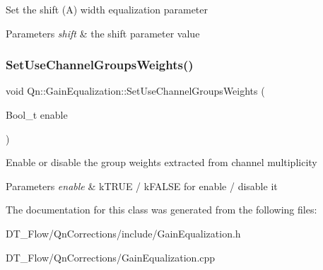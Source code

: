 Set the shift (A) width equalization parameter 
\begin{DoxyParams}{Parameters}
{\em shift} & the shift parameter value \\
\hline
\end{DoxyParams}
\mbox{\label{classQn_1_1GainEqualization_af136135624a62a1372fcf31548b358d7}} 
\subsubsection{\texorpdfstring{Set\+Use\+Channel\+Groups\+Weights()}{SetUseChannelGroupsWeights()}}
{\footnotesize\ttfamily void Qn\+::\+Gain\+Equalization\+::\+Set\+Use\+Channel\+Groups\+Weights (\begin{DoxyParamCaption}\item[{Bool\+\_\+t}]{enable }\end{DoxyParamCaption})\hspace{0.3cm}{\ttfamily [inline]}}

Enable or disable the group weights extracted from channel multiplicity 
\begin{DoxyParams}{Parameters}
{\em enable} & k\+T\+R\+UE / k\+F\+A\+L\+SE for enable / disable it \\
\hline
\end{DoxyParams}


The documentation for this class was generated from the following files\+:\begin{DoxyCompactItemize}
\item 
D\+T\+\_\+\+Flow/\+Qn\+Corrections/include/Gain\+Equalization.\+h\item 
D\+T\+\_\+\+Flow/\+Qn\+Corrections/Gain\+Equalization.\+cpp\end{DoxyCompactItemize}
